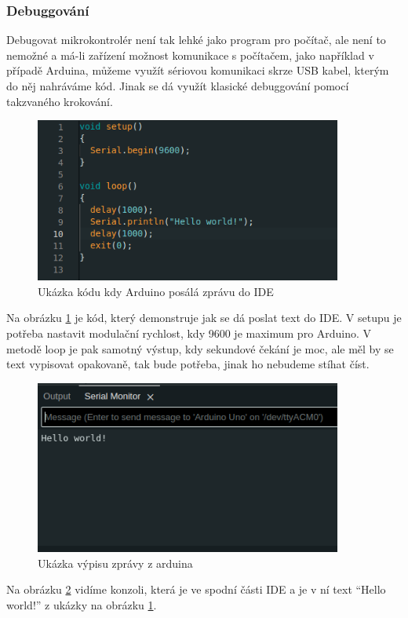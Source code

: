 \subsubsection{Debuggování}
Debugovat mikrokontrolér není tak lehké jako program pro počítač, ale není to nemožné a má-li zařízení možnost komunikace s počítačem, jako například v případě Arduina, můžeme využít sériovou komunikaci skrze USB kabel, kterým do něj nahráváme kód. Jinak se dá využít klasické debuggování pomocí takzvaného krokování.
\begin{figure}[H]
	\centering
	\includegraphics[width=0.9\textwidth]{pictures/code.png}
    	\caption{Ukázka kódu kdy Arduino posálá zprávu do IDE}
   	\label{fig:usbIDE}
\end{figure}

Na obrázku \ref{fig:usbIDE} je kód, který demonstruje jak se dá poslat text do IDE. V setupu je potřeba nastavit modulační rychlost, kdy 9600 je maximum pro Arduino. V metodě loop je pak samotný výstup, kdy sekundové čekání je moc, ale měl by se text vypisovat opakovaně, tak bude potřeba, jinak ho nebudeme stíhat číst.

\begin{figure}[H]
	\centering
	\includegraphics[width=0.9\textwidth]{pictures/message.png}
    	\caption{Ukázka výpisu zprávy z arduina}
   	\label{fig:msgIDE}
\end{figure}
Na obrázku \ref{fig:msgIDE} vidíme konzoli, která je ve spodní části IDE a je v ní text “Hello world!” z ukázky na obrázku \ref{fig:usbIDE}.


